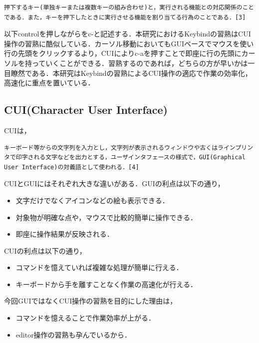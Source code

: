\documentclass[11pt,dvipdfmx]{jsarticle}
\providecommand{\tightlist}{%
      \setlength{\itemsep}{0pt}\setlength{\parskip}{0pt}}
\begin{document}
\begin{verbatim}
押下するキー(単独キーまたは複数キーの組み合わせ)と，実行される機能との対応関係のことである．また，キーを押下したときに実行させる機能を割り当てる行為のことである．[3]
\end{verbatim}

以下controlを押しながらをc-と記述する．本研究におけるKeybindの習熟はCUI操作の習熟に酷似している．カーソル移動においてもGUIベースでマウスを使い行の先頭をクリックするより，CUIによりc-aを押すことで即座に行の先頭にカーソルを持っていくことができる．習熟するのであれば，どちらの方が早いかは一目瞭然である．本研究はKeybindの習熟によるCUI操作の適応で作業の効率化，高速化に重点を置いている．

    \subsection{CUI(Character User
Interface)}\label{cuicharacter-user-interface}

CUIは，

\begin{verbatim}
キーボード等からの文字列を入力とし，文字列が表示されるウィンドウや古くはラインプリンタで印字される文字などを出力とする，ユーザインタフェースの様式で，GUI(Graphical User Interface)の対義語として使われる．[4]
\end{verbatim}

CUIとGUIにはそれぞれ大きな違いがある．GUIの利点は以下の通り，

\begin{itemize}
\tightlist
\item
  文字だけでなくアイコンなどの絵も表示できる．
\item
  対象物が明確な点や，マウスで比較的簡単に操作できる．
\item
  即座に操作結果が反映される．
\end{itemize}

CUIの利点は以下の通り，

\begin{itemize}
\tightlist
\item
  コマンドを憶えていれば複雑な処理が簡単に行える．
\item
  キーボードから手を離すことなく作業の高速化が行える．
\end{itemize}

今回GUIではなくCUI操作の習熟を目的にした理由は，

\begin{itemize}
\tightlist
\item
  コマンドを憶えることで作業効率が上がる．
\item
  editor操作の習熟も孕んでいるから．
\end{itemize}
\end{document}
